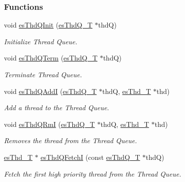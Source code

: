 \subsubsection*{Functions}
\begin{DoxyCompactItemize}
\item 
void \hyperlink{group__kern__thdq_gaddd5fe0557c91559b9452beb0fc236fd}{es\-Thd\-Q\-Init} (\hyperlink{group__kern__thdq_ga7a1a060699e83a01512ebb5540019556}{es\-Thd\-Q\-\_\-\-T} $\ast$thd\-Q)
\begin{DoxyCompactList}\small\item\em Initialize Thread Queue. \end{DoxyCompactList}\item 
void \hyperlink{group__kern__thdq_gaa5f19b32a7f0c42616b5270dcbd73a3e}{es\-Thd\-Q\-Term} (\hyperlink{group__kern__thdq_ga7a1a060699e83a01512ebb5540019556}{es\-Thd\-Q\-\_\-\-T} $\ast$thd\-Q)
\begin{DoxyCompactList}\small\item\em Terminate Thread Queue. \end{DoxyCompactList}\item 
void \hyperlink{group__kern__thdq_ga9da1e71c137d8adb8c9bdead7052b5fa}{es\-Thd\-Q\-Add\-I} (\hyperlink{group__kern__thdq_ga7a1a060699e83a01512ebb5540019556}{es\-Thd\-Q\-\_\-\-T} $\ast$thd\-Q, \hyperlink{group__kern__thd_ga62e3a3ca0a4597a19c43cb8868810d82}{es\-Thd\-\_\-\-T} $\ast$thd)
\begin{DoxyCompactList}\small\item\em Add a thread to the Thread Queue. \end{DoxyCompactList}\item 
void \hyperlink{group__kern__thdq_gaa18afa95e34035da03c5cb7ea3a96320}{es\-Thd\-Q\-Rm\-I} (\hyperlink{group__kern__thdq_ga7a1a060699e83a01512ebb5540019556}{es\-Thd\-Q\-\_\-\-T} $\ast$thd\-Q, \hyperlink{group__kern__thd_ga62e3a3ca0a4597a19c43cb8868810d82}{es\-Thd\-\_\-\-T} $\ast$thd)
\begin{DoxyCompactList}\small\item\em Removes the thread from the Thread Queue. \end{DoxyCompactList}\item 
\hyperlink{group__kern__thd_ga62e3a3ca0a4597a19c43cb8868810d82}{es\-Thd\-\_\-\-T} $\ast$ \hyperlink{group__kern__thdq_ga1670c123f31c346b24ec9d2b7ae35f88}{es\-Thd\-Q\-Fetch\-I} (const \hyperlink{group__kern__thdq_ga7a1a060699e83a01512ebb5540019556}{es\-Thd\-Q\-\_\-\-T} $\ast$thd\-Q)
\begin{DoxyCompactList}\small\item\em Fetch the first high priority thread from the Thread Queue. \end{DoxyCompactList}\item 

\end{DoxyCompactItemize}
